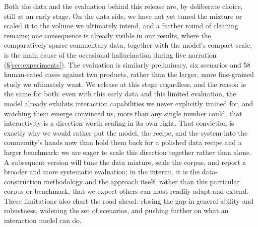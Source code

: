 \documentclass{llmxive}
\begin{document}
Both the data and the evaluation behind this release are, by deliberate choice, still at an early stage. On the data side, we have not yet tuned the mixture or scaled it to the volume we ultimately intend, and a further round of cleaning remains; one consequence is already visible in our results, where the comparatively sparse commentary data, together with the model's compact scale, is the main cause of the occasional hallucination during live narration (\S\ref{sec:experiments}). The evaluation is similarly preliminary, six scenarios and 58 human-rated cases against two products, rather than the larger, more fine-grained study we ultimately want. We release at this stage regardless, and the reason is the same for both: even with this early data and this limited evaluation, the model already exhibits interaction capabilities we never explicitly trained for, and watching them emerge convinced us, more than any single number could, that interactivity is a direction worth scaling in its own right. That conviction is exactly why we would rather put the model, the recipe, and the system into the community's hands now than hold them back for a polished data recipe and a larger benchmark: we are eager to scale this direction together rather than alone. A subsequent version will tune the data mixture, scale the corpus, and report a broader and more systematic evaluation; in the interim, it is the data-construction methodology and the approach itself, rather than this particular corpus or benchmark, that we expect others can most readily adapt and extend. These limitations also chart the road ahead: closing the gap in general ability and robustness, widening the set of scenarios, and pushing further on what an interaction model can do.


\end{document}
